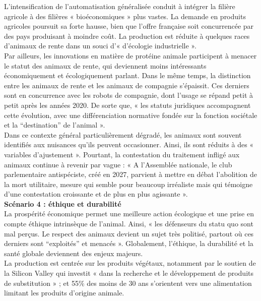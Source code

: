 \documentclass[10pt]{article}
\begin{document}
L’intensification de l’automatisation généralisée conduit à intégrer la filière agricole à des filières « bioéconomiques » plus vastes. La demande en produits agricoles poursuit sa forte hausse, bien que l’offre française soit concurrencée par des pays produisant à moindre coût. La production est réduite à quelques races d’animaux de rente dans un souci d’« d’écologie industrielle ».\\

Par ailleurs, les innovations en matière de protéine animale participent à menacer le statut des animaux de rente, qui deviennent moins intéressants économiquement et écologiquement parlant. Dans le même temps, la distinction entre les animaux de rente et les animaux de compagnie s’épaissit. Ces derniers sont en concurrence avec les robots de compagnie, dont l’usage se répand petit à petit après les années 2020. De sorte que, « les statuts juridiques accompagnent cette évolution, avec une différenciation normative fondée sur la fonction sociétale et la “destination” de l’animal ».\\

Dans ce contexte général particulièrement dégradé, les animaux sont souvent identifiés aux nuisances qu’ils peuvent occasionner. Ainsi, ils sont réduits à des « variables d’ajustement ». Pourtant, la contestation du traitement infligé aux animaux continue à revenir par vague : « A l’Assemblée nationale, le club parlementaire antispéciste, créé en 2027, parvient à mettre en débat l’abolition de la mort utilitaire, mesure qui semble pour beaucoup irréaliste mais qui témoigne d’une contestation croissante et de plus en plus agissante ».\\

\textbf{Scénario 4 : éthique et durabilité}\\

La prospérité économique permet une meilleure action écologique et une prise en compte éthique intrinsèque de l’animal. Ainsi, « les défenseurs du statu quo sont mal perçus. Le respect des animaux devient un sujet très politisé, partout où ces derniers sont “exploités” et menacés ». Globalement, l’éthique, la durabilité et la santé globale deviennent des enjeux majeurs.\\

La production est centrée sur les produits végétaux, notamment par le soutien de la Silicon Valley qui investit « dans la recherche et le développement de produits de substitution » ; et 55\% des moins de 30 ans s’orientent vers une alimentation limitant les produits d’origine animale.\\
\end{document}
